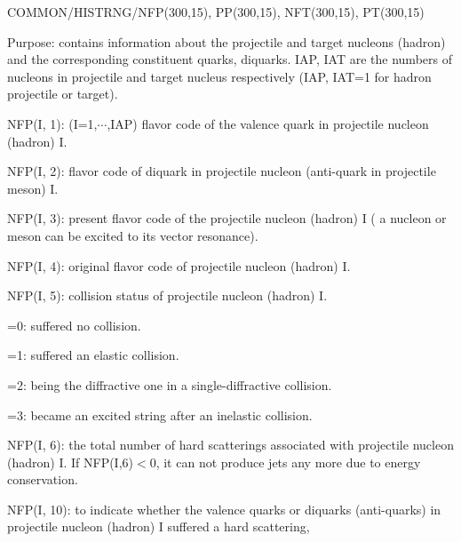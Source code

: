 \begin{description}
\itemsep=-4.0pt
\item{}COMMON/HISTRNG/NFP(300,15), PP(300,15), NFT(300,15), PT(300,15)
\item{}Purpose: contains information about the projectile and 
        target nucleons (hadron) and the corresponding constituent 
        quarks, diquarks. IAP, IAT are the numbers of nucleons in 
        projectile and target nucleus respectively (IAP, IAT=1 
        for hadron projectile or target).
\item{}NFP(I, 1): (I=1,$\cdots$,IAP) flavor code of the valence quark in 
                projectile nucleon (hadron) I.
\item{}NFP(I, 2): flavor code of diquark in projectile nucleon (anti-quark
                in projectile meson) I.
\item{}NFP(I, 3): present flavor code of the projectile nucleon (hadron) I
                ( a nucleon or meson can be excited to its vector resonance).
\item{}NFP(I, 4): original flavor code of projectile nucleon (hadron) I.
\item{}NFP(I, 5): collision status of projectile nucleon (hadron) I.
        \vspace{-12.0pt}
        \begin{description}
        \itemsep=-4.0pt
                \item{}=0: suffered no collision.
                \item{}=1: suffered an elastic collision.
                \item{}=2: being the diffractive one in a single-diffractive
                        collision.
                \item{}=3: became an excited string after an inelastic
                        collision.
        \end{description}
        \vspace{-4.0pt}
\item{}NFP(I, 6): the total number of hard scatterings associated with 
                projectile nucleon (hadron) I. If NFP(I,6)$<0$, it can not 
                        produce jets any more due to energy conservation.
\item{}NFP(I, 10): to indicate whether the valence quarks or diquarks 
                (anti-quarks) in projectile nucleon (hadron) I 
                suffered a hard scattering,
        \vspace{-12.0pt}
        \begin{description}

\end{description}
\end{description}
